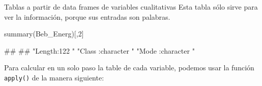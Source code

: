 \documentclass[
  ignorenonframetext,
  aspectratio=169]{beamer}
\newenvironment{Shaded}{\begin{snugshade}}{\end{snugshade}}
\newcommand{\AttributeTok}[1]{\textcolor[rgb]{0.77,0.63,0.00}{#1}}
\newcommand{\DecValTok}[1]{\textcolor[rgb]{0.00,0.00,0.81}{#1}}
\newcommand{\FunctionTok}[1]{\textcolor[rgb]{0.00,0.00,0.00}{#1}}
\newcommand{\NormalTok}[1]{#1}
\let\oldverbatim\verbatim
\let\endoldverbatim\endverbatim
\renewenvironment{verbatim}{\tiny\oldverbatim}{\endoldverbatim}
\begin{document}
\begin{frame}[fragile]{Tablas a partir de data frames de variables
cualitativas}
\protect\hypertarget{tablas-a-partir-de-data-frames-de-variables-cualitativas-4}{}
Esta tabla sólo sirve para ver la información, porque sus entradas son
palabras.

\begin{Shaded}
\begin{Highlighting}[]
\FunctionTok{summary}\NormalTok{(Beb\_Energ)[,}\DecValTok{2}\NormalTok{]}
\end{Highlighting}
\end{Shaded}

\begin{verbatim}
##                                                                
## "Length:122        " "Class :character  " "Mode  :character  "
\end{verbatim}

Para calcular en un solo paso la table de cada variable, podemos usar la
función \texttt{apply()} de la manera siguiente:
\end{frame}

\end{document}

